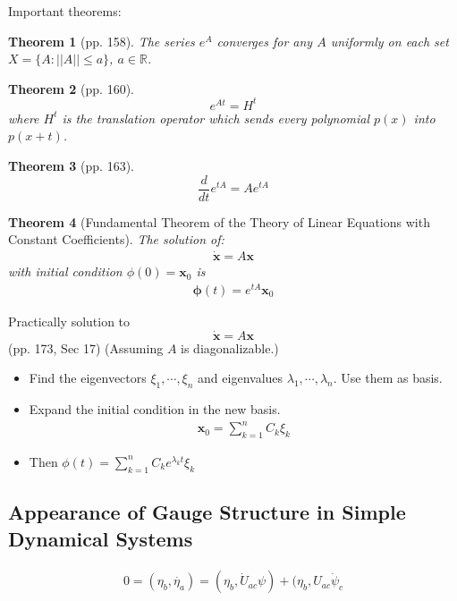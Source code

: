 \documentclass{article}
\numberwithin{equation}{subsection} %
\newtheorem{thm}{Theorem}[section]
\theoremstyle{definition}
\begin{document}
    Important theorems:
    \begin{thm}[pp. 158]
        The series $e^A$ converges for any $A$ uniformly on each set
        $X=\{A:||A||\leq a\}$, $a\in \mathbb{R}$.
    \end{thm}
    \begin{thm}[pp. 160]
        $$e^{At} = H^t$$
        where $H^t$ is the translation operator which sends every polynomial
        $p(x)$ into $p(x+t)$.
    \end{thm}
    \begin{thm}[pp. 163]
        $$\frac{d}{dt} e^{tA} = Ae^{tA}$$
    \end{thm}
    \begin{thm}[Fundamental Theorem of the Theory of Linear Equations with
        Constant Coefficients]
        The solution of:
        \begin{align}
            \label{eq:fund_thm_of_linear_eqs_const_coef}
            \dot{\mathbf{x}} = A\mathbf{x}
        \end{align}
        with initial condition $\phi(0) = \mathbf{x}_0$ is
        \begin{align}
            \mathbf{\phi}(t) = e^{tA}\mathbf{x}_0
        \end{align}
    \end{thm}
    
    Practically solution to
    $$ \dot{\mathbf{x}} = A\mathbf{x}$$
    (pp. 173, Sec 17)
    (Assuming $A$ is diagonalizable.)
    \begin{itemize}
        \item Find the eigenvectors $\xi_1,\cdots ,\xi_n$ and eigenvalues
            $\lambda_1,\cdots ,\lambda_n$. Use them as basis.
        \item Expand the initial condition in the new basis.
            \begin{align}
                \mathbf{x}_0=\sum_{k=1}^{n} C_k\xi_k
            \end{align}
        \item Then $\phi(t) = \sum_{k=1}^n C_k e^{\lambda_k t}\xi_k$
    \end{itemize}
    \subsection{Appearance of Gauge Structure in Simple Dynamical Systems}
    
    \begin{align}
        0=(\eta_b,\dot{\eta_a}) = (\eta_b,\dot{U}_{ac}\psi) +
            (\eta_b,U_{ac}\dot{\psi}_c
    \end{align}
\end{document}
